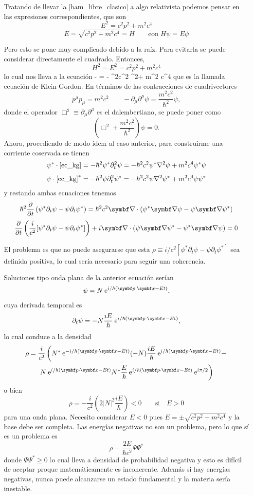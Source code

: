 \documentclass[10pt,oneside]{CBFT_book}
\begin{document}
Tratando de llevar la \eqref{ham_libre_clasico} a algo relativista podemos pensar en las expresiones
correspondientes, que son
\[
	E^2 = c^2 p^2 + m^2 c^4
\]
\[
	E = \sqrt{ c^2 p^2 + m^2 c^4 } = H \qquad \text{con} \; H\psi = E\psi
\]

Pero esto se pone muy complicado debido a la raíz. Para evitarla se puede considerar directamente
el cuadrado.
Entonces,
\[
	H^2 = E^2 = c^2p^2 + m^2c^4
\]
lo cual nos lleva a la ecuación
\be 
	-\hbar {} = - \hbar^2c^2 \Nabla^2\psi + m^2 c^4 \psi
	\label{ec_kg}
\ee
que es la llamada ecuación de Klein-Gordon.
En términos de las contracciones de cuadrivectores 
\[
	p^\mu p_\mu = m^2c^2 \qquad -\partial_\mu\partial^\mu \psi = \frac{m^2c^2}{\hbar^2}\psi,
\]
donde el operador $\Box^2 \equiv \partial_\mu\partial^\mu$ es el dalembertiano, se puede poner
como
\[
	\left( \Box^2 + \frac{m^2c^2}{\hbar^2} \right) \psi = 0.
\]
Ahora, procediendo de modo ídem al caso anterior, para construirme una corriente coservada
se tienen
\[
	\psi^* \cdot \eqref{ec_kg} = - \hbar^2 \psi^* \partial_t^2 \psi =
	- \hbar^2 c^2 \psi^* \nabla^2 \psi + m^2 c^4 \psi^*\psi
\]
\[
	\psi \cdot \eqref{ec_kg}^* = - \hbar^2 \psi \partial_t^2 \psi^* =
	- \hbar^2 c^2 \psi \nabla^2 \psi^* + m^2 c^4 \psi\psi^*
\]
y restando ambas ecuaciones tenemos
\[
	\hbar^2 \dpar{}{t}\left(  \psi^* \partial_t \psi -  \psi \partial_t \psi^* \right) =
	\hbar^2 c^2 \Nabla\cdot( \psi^* \Nabla \psi - \psi \Nabla \psi^* )
\]
\[
	\dpar{}{t}\left( \frac{i}{c^2}[ \psi^* \partial_t \psi -  \psi \partial_t \psi^* ]\right) +
	i\Nabla\cdot( \psi \Nabla \psi^* - \psi^* \Nabla \psi ) = 0
\]

El problema es que no puede asegurarse que esta $\rho \equiv i/c^2[ \psi^* \partial_t \psi -  \psi \partial_t 
\psi^* ]$ sea definida positiva, lo cual sería necesario para seguir una coherencia.

Soluciones tipo onda plana de la anterior ecuación serían
\[
	\psi = N \euler^{ i/\hbar(\pe{p}{x} - Et)},
\]
cuya derivada temporal es
\[
	\partial_t \psi = -N \frac{iE}{\hbar} \euler^{ i/\hbar(\pe{p}{x} - Et)},
\]
lo cual conduce a la densidad
\begin{multline*}
	\rho = \frac{i}{c^2}\left( N^*\euler^{ -i/\hbar(\pe{p}{x} - Et)}(-N)
	\frac{iE}{\hbar} \euler^{ i/\hbar(\pe{p}{x} - Et)} - \right. \\ 
	\left. N \euler^{ i/\hbar(\pe{p}{x} - Et)}N^*\frac{E}{\hbar} 
	\euler^{ i/\hbar(\pe{p}{x} - Et)}\euler^{i\pi/2}
	\right) 
\end{multline*}
o bien
\[
	\rho = -\frac{i}{c^2}\left( 2|N|^2 \frac{iE}{\hbar} \right) < 0 
	\qquad \text{si} \quad E > 0
\]
para una onda plana.
Necesito considerar $E<0$ pues $E=\pm\sqrt{c^2p^2+m^2c^4}$ y la base debe ser completa.
Las energías negativas no son un problema, pero lo que sí es un problema es
\[
	\rho = \frac{2E}{\hbar c^2} \Psi \Psi^*
\]
donde $ \Psi \Psi^* \geq 0 $ lo cual lleva a densidad de probabilidad negativa y esto es
difícil de aceptar proque matemáticamente es incoherente.
Además si hay energías negativas, nunca puede alcanzarse un estado fundamental y la materia
sería inestable.
\end{document}
